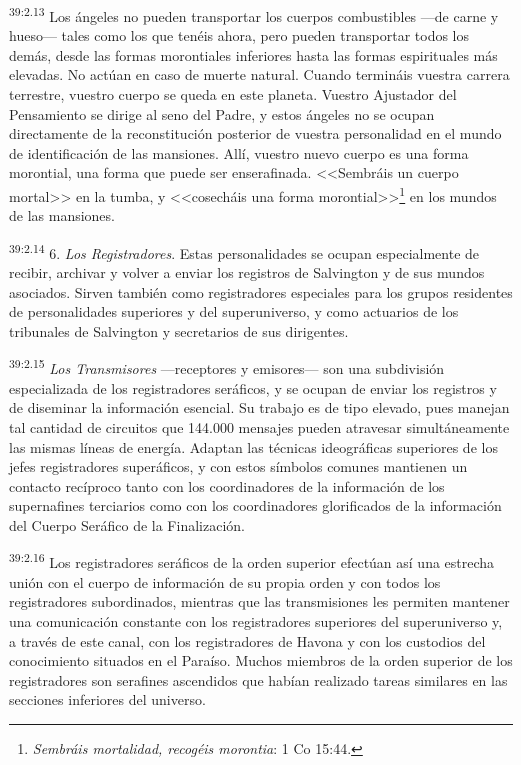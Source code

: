 \par
\textsuperscript{39:2.13} Los ángeles no pueden transportar los cuerpos combustibles ---de carne y hueso--- tales como los que tenéis ahora, pero pueden transportar todos los demás, desde las formas morontiales inferiores hasta las formas espirituales más elevadas. No actúan en caso de muerte natural. Cuando termináis vuestra carrera terrestre, vuestro cuerpo se queda en este planeta. Vuestro Ajustador del Pensamiento se dirige al seno del Padre, y estos ángeles no se ocupan directamente de la reconstitución posterior de vuestra personalidad en el mundo de identificación de las mansiones. Allí, vuestro nuevo cuerpo es una forma morontial, una forma que puede ser enserafinada. <<Sembráis un cuerpo mortal>> en la tumba, y <<cosecháis una forma morontial>>\footnote{\textit{Sembráis mortalidad, recogéis morontia}: 1 Co 15:44.} en los mundos de las mansiones.

\par
\textsuperscript{39:2.14} 6. \textit{Los Registradores}. Estas personalidades se ocupan especialmente de recibir, archivar y volver a enviar los registros de Salvington y de sus mundos asociados. Sirven también como registradores especiales para los grupos residentes de personalidades superiores y del superuniverso, y como actuarios de los tribunales de Salvington y secretarios de sus dirigentes.

\par
\textsuperscript{39:2.15} \textit{Los Transmisores} ---receptores y emisores--- son una subdivisión especializada de los registradores seráficos, y se ocupan de enviar los registros y de diseminar la información esencial. Su trabajo es de tipo elevado, pues manejan tal cantidad de circuitos que 144.000 mensajes pueden atravesar simultáneamente las mismas líneas de energía. Adaptan las técnicas ideográficas superiores de los jefes registradores superáficos, y con estos símbolos comunes mantienen un contacto recíproco tanto con los coordinadores de la información de los supernafines terciarios como con los coordinadores glorificados de la información del Cuerpo Seráfico de la Finalización.

\par
\textsuperscript{39:2.16} Los registradores seráficos de la orden superior efectúan así una estrecha unión con el cuerpo de información de su propia orden y con todos los registradores subordinados, mientras que las transmisiones les permiten mantener una comunicación constante con los registradores superiores del superuniverso y, a través de este canal, con los registradores de Havona y con los custodios del conocimiento situados en el Paraíso. Muchos miembros de la orden superior de los registradores son serafines ascendidos que habían realizado tareas similares en las secciones inferiores del universo.

